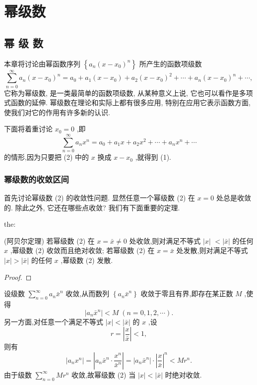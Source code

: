 \chapter{幂级数}

\section{幂 级 数}

本章将讨论由幂函数序列 \(\left\{  {{a}_{n}{\left( x - {x}_{0}\right) }^{n}}\right\}\) 所产生的函数项级数
\[
\mathop{\sum }\limits_{{n = 0}}^{\infty }{a}_{n}{\left( x - {x}_{0}\right) }^{n} = {a}_{0} + {a}_{1}\left( {x - {x}_{0}}\right)  + {a}_{2}{\left( x - {x}_{0}\right) }^{2} + \cdots  + {a}_{n}{\left( x - {x}_{0}\right) }^{n} + \cdots , \tag{1}
\]
它称为幂级数, 是一类最简单的函数项级数, 从某种意义上说, 它也可以看作是多项式函数的延伸. 幂级数在理论和实际上都有很多应用, 特别在应用它表示函数方面, 使我们对它的作用有许多新的认识.

下面将着重讨论 \({x}_{0} = 0\) ,即
\[
\mathop{\sum }\limits_{{n = 0}}^{\infty }{a}_{n}{x}^{n} = {a}_{0} + {a}_{1}x + {a}_{2}{x}^{2} + \cdots  + {a}_{n}{x}^{n} + \cdots  \tag{2}
\]
的情形,因为只要把 (2) 中的 \(x\) 换成 \(x - {x}_{0}\) ,就得到 (1).

\subsection{幂级数的收敛区间}

首先讨论幂级数 (2) 的收敛性问题. 显然任意一个幂级数 (2) 在 \(x = 0\) 处总是收敛的. 除此之外, 它还在哪些点收敛? 我们有下面重要的定理.

\begin{theorem}{}{the:}

\end{theorem}
 (阿贝尔定理) 若幂级数 (2) 在 \(x = \bar{x} \neq  0\) 处收敛,则对满足不等式 \(\left| x\right|\)  \(< \left| \bar{x}\right|\) 的任何 \(x\) ,幂级数 (2) 收敛而且绝对收敛; 若幂级数 (2) 在 \(x = \bar{x}\) 处发散,则对满足不等式 \(\left| x\right|  > \left| \bar{x}\right|\) 的任何 \(x\) ,幂级数 (2) 发散.

\begin{proof}

\end{proof}
设级数 \(\mathop{\sum }\limits_{{n = 0}}^{\infty }{a}_{n}{\bar{x}}^{n}\) 收敛,从而数列 \(\left\{  {{a}_{n}{\bar{x}}^{n}}\right\}\) 收敛于零且有界,即存在某正数 \(M\) ,使得
\[
\left| {{a}_{n}{\bar{x}}^{n}}\right|  < M\;\left( {n = 0,1,2,\cdots }\right) .
\]
另一方面,对任意一个满足不等式 \(\left| x\right|  < \left| \bar{x}\right|\) 的 \(x\) ,设
\[
r = \left| \frac{x}{\bar{x}}\right|  < 1,
\]
则有
\[
\left| {{a}_{n}{x}^{n}}\right|  = \left| {{a}_{n}{\bar{x}}^{n} \cdot  \frac{{x}^{n}}{{\bar{x}}^{n}}}\right|  = \left| {{a}_{n}{\bar{x}}^{n}}\right|  \cdot  {\left| \frac{x}{\bar{x}}\right| }^{n} < M{r}^{n}.
\]
由于级数 \(\mathop{\sum }\limits_{{n = 0}}^{\infty }M{r}^{n}\) 收敛,故幂级数 (2) 当 \(\left| x\right|  < \left| \bar{x}\right|\) 时绝对收敛.

